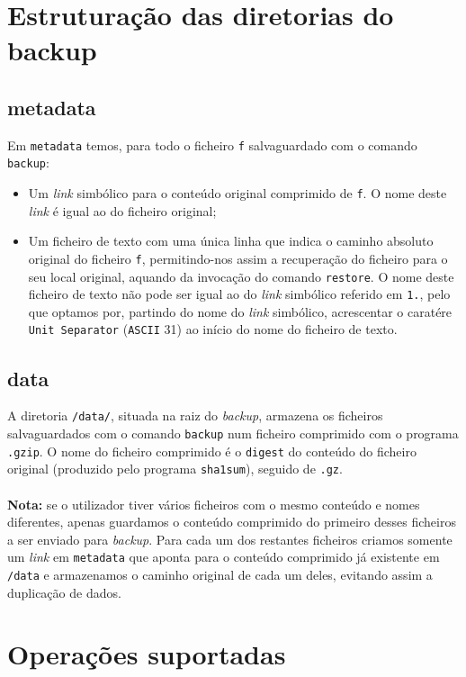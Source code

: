 \documentclass[a4paper,12pt,titlepage,portuguese]{article}
\begin{document}
\section{Estruturação das diretorias do backup}

\subsection{metadata}
Em \texttt{metadata} temos, para todo o ficheiro \texttt{f} salvaguardado com o comando \texttt{backup}:
	\begin{itemize}
		\item Um \emph{link} simbólico para o conteúdo original comprimido de \texttt{f}. O nome deste \emph{link} é igual ao do ficheiro original;
		\item Um ficheiro de texto com uma única linha que indica o caminho absoluto original do ficheiro \texttt{f}, permitindo-nos assim a recuperação do ficheiro para o seu local original, aquando da invocação do comando \texttt{restore}. O nome deste ficheiro de texto não pode ser igual ao do \emph{link} simbólico referido em \texttt{1.}, pelo que optamos por, partindo do nome do \emph{link} simbólico, acrescentar o caratére \texttt{Unit Separator} (\texttt{ASCII} 31) ao início do nome do ficheiro de texto.
	\end{itemize}

\subsection{data}
A diretoria \texttt{/data/}, situada na raiz do \emph{backup}, armazena os ficheiros salvaguardados com o comando \texttt{backup} num ficheiro comprimido com o programa \texttt{.gzip}. O nome do ficheiro comprimido é o \texttt{digest} do conteúdo do ficheiro original (produzido pelo programa \texttt{sha1sum}), seguido de \texttt{.gz}.\\\\\textbf{Nota:} se o utilizador tiver vários ficheiros com o mesmo conteúdo e nomes diferentes, apenas guardamos o conteúdo comprimido do primeiro desses ficheiros a ser enviado para \emph{backup}. Para cada um dos restantes ficheiros criamos somente um \emph{link} em \texttt{metadata} que aponta para o conteúdo comprimido já existente em \texttt{/data} e armazenamos o caminho original de cada um deles, evitando assim a duplicação de dados.

\section{Operações suportadas}
\end{document}

